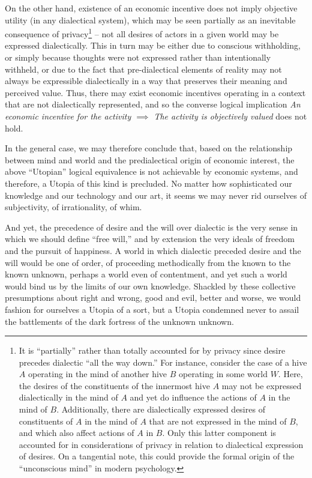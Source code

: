 \documentclass[pra,twocolumn,groupedaddress,10pt]{revtex4}
\theoremstyle{definition}
\begin{document}
On the other hand, existence of an economic incentive does not imply objective utility (in any dialectical system), which may be seen partially as an inevitable consequence of privacy\footnote{It is ``partially'' rather than totally accounted for by privacy since desire precedes dialectic ``all the way down.'' For instance, consider the case of a hive $A$ operating in the mind of another hive $B$ operating in some world $W$. Here, the desires of the constituents of the innermost hive $A$ may not be expressed dialectically in the mind of $A$ and yet do influence the actions of $A$ in the mind of $B$. Additionally, there are dialectically expressed desires of constituents of $A$ in the mind of $A$ that are not expressed in the mind of $B$, and which also affect actions of $A$ in $B$. Only this latter component is accounted for in considerations of privacy in relation to dialectical expression of desires. On a tangential note, this could provide the formal origin of the ``unconscious mind'' in modern psychology.} -- not all desires of actors in a given world may be expressed dialectically. This in turn may be either due to conscious withholding, or simply because thoughts were not expressed rather than intentionally withheld, or due to the fact that pre-dialectical elements of reality may not always be expressible dialectically in a way that preserves their meaning and perceived value. Thus, there may exist economic incentives operating in a context that are not dialectically represented, and so the converse logical implication \emph{An economic incentive for the activity $\implies$ The activity is objectively valued} does not hold.

In the general case, we may therefore conclude that, based on the relationship between mind and world and the predialectical origin of economic interest, the above ``Utopian'' logical equivalence is not achievable by economic systems, and therefore, a Utopia of this kind is precluded. No matter how sophisticated our knowledge and our technology and our art, it seems we may never rid ourselves of subjectivity, of irrationality, of whim.

And yet, the precedence of desire and the will over dialectic is the very sense in which we should define ``free will,'' and by extension the very ideals of freedom and the pursuit of happiness. A world in which dialectic preceded desire and the will would be one of order, of proceeding methodically from the known to the known unknown, perhaps a world even of contentment, and yet such a world would bind us by the limits of our own knowledge. Shackled by these collective presumptions about right and wrong, good and evil, better and worse, we would fashion for ourselves a Utopia of a sort, but a Utopia condemned never to assail the battlements of the dark fortress of the unknown unknown.
\end{document}
